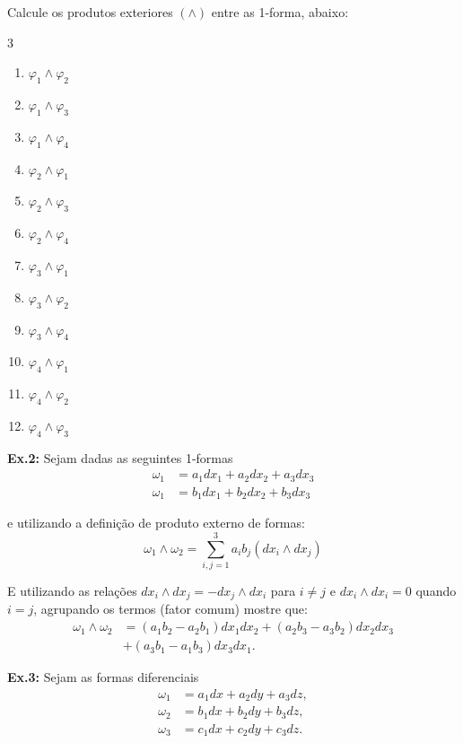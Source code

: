 Calcule os produtos exteriores $(\wedge)$ entre as 1-forma, abaixo:
%
\begin{multicols}{3}
\begin{enumerate}
	\item $\varphi_1 \wedge \varphi_2 $
	\item $\varphi_1 \wedge \varphi_3 $
	\item $\varphi_1 \wedge \varphi_4 $
	\item $\varphi_2 \wedge \varphi_1 $
	\item $\varphi_2 \wedge \varphi_3 $
	\item $\varphi_2 \wedge \varphi_4 $
	\item $\varphi_3 \wedge \varphi_1 $
	\item $\varphi_3 \wedge \varphi_2 $
	\item $\varphi_3 \wedge \varphi_4 $
	\item $\varphi_4 \wedge \varphi_1 $
	\item $\varphi_4 \wedge \varphi_2 $
	\item $\varphi_4 \wedge \varphi_3 $
\end{enumerate}
\end{multicols} 


\noindent\textbf{Ex.2:} 
Sejam dadas as seguintes 1-formas 
%
\begin{align}
\nonumber \omega_1 &= a_1dx_1 + a_2dx_2 + a_3dx_3
\\
\nonumber \omega_1 &= b_1dx_1 + b_2dx_2 + b_3dx_3
\end{align}

e utilizando a definição de produto externo de formas:
%
\[
\omega_1\wedge\omega_2 
= \sum_{i,j = 1}^{3}a_ib_j(dx_i \wedge dx_j)
\]

E utilizando as relações $dx_i\wedge dx_j = - dx_j\wedge dx_i$ para $i \neq j$ e $dx_i\wedge dx_i = 0$ quando $i = j$, agrupando os termos (fator comum) mostre que:
%
\begin{align}
\nonumber \omega_1 \wedge \omega_2 &= (a_1b_2 - a_2b_1)dx_1dx_2 
+ (a_2b_3 - a_3b_2)dx_2dx_3 
\\
&+ (a_3b_1 - a_1b_3)dx_3dx_1.
\end{align}

\noindent\textbf{Ex.3:} 
Sejam as formas diferenciais 
%
\begin{align}
\nonumber \omega_1 &= a_1dx + a_2dy + a_3dz,
\\
\nonumber \omega_2 &= b_1dx + b_2dy + b_3dz,
\\
\nonumber \omega_3 &= c_1dx + c_2dy + c_3dz.
\end{align}

